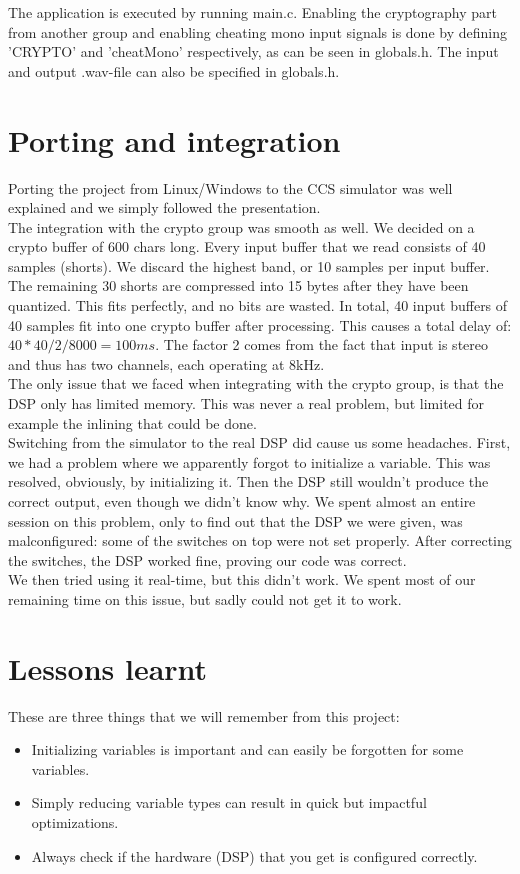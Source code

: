 \documentclass[a4paper]{article}
\begin{document}
The application is executed by running main.c. Enabling the cryptography part from another group and enabling cheating mono input signals is done by defining 'CRYPTO' and 'cheatMono' respectively, as can be seen in globals.h. The input and output .wav-file can also be specified in globals.h.

\section{Porting and integration}
Porting the project from Linux/Windows to the CCS simulator was well explained and we simply followed the presentation. \\

The integration with the crypto group was smooth as well. We decided on a crypto buffer of 600 chars long. Every input buffer that we read consists of 40 samples (shorts). We discard the highest band, or 10 samples per input buffer. The remaining 30 shorts are compressed into 15 bytes after they have been quantized. This fits perfectly, and no bits are wasted. In total, 40 input buffers of 40 samples fit into one crypto buffer after processing. This causes a total delay of: $40*40/2/8000 = 100ms$. The factor 2 comes from the fact that input is stereo and thus has two channels, each operating at 8kHz. \\
The only issue that we faced when integrating with the crypto group, is that the DSP only has limited memory. This was never a real problem, but limited for example the inlining that could be done. \\
Switching from the simulator to the real DSP did cause us some headaches. First, we had a problem where we apparently forgot to initialize a variable. This was resolved, obviously, by initializing it. Then the DSP still wouldn't produce the correct output, even though we didn't know why. We spent almost an entire session on this problem, only to find out that the DSP we were given, was malconfigured: some of the switches on top were not set properly. After correcting the switches, the DSP worked fine, proving our code was correct. \\
We then tried using it real-time, but this didn't work. We spent most of our remaining time on this issue, but sadly could not get it to work.

\section{Lessons learnt}
These are three things that we will remember from this project:
\begin{itemize}
\item Initializing variables is important and can easily be forgotten for some variables.
\item Simply reducing variable types can result in quick but impactful optimizations.
\item Always check if the hardware (DSP) that you get is configured correctly.
\end{itemize}
\end{document}
